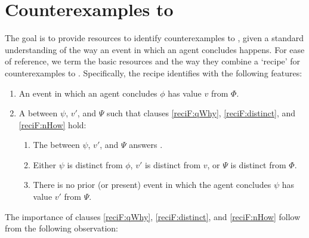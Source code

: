 \section*{Counterexamples to \issueInclusion{}}


\begin{note}
  The goal is to provide resources to identify counterexamples to \issueInclusion{}, given a standard understanding of the way an event in which an agent concludes happens.
  For ease of reference, we term the basic resources and the way they combine a `recipe' for counterexamples to \issueInclusion{}.
  Specifically, the recipe identifies  with the following features:
  \begin{enumerate}
  \item
    An event in which an agent concludes \(\phi\) has value \(v\) from \(\Phi\).
  \item
    A \ros{} between \(\psi\), \(v'\), and \(\Psi\) such that clauses \ref{reciF:qWhy}, \ref{reciF:distinct}, and \ref{reciF:nHow} hold:
    \begin{enumerate}[label=\Alph*., ref=\Alph*]
    \item
      \label{reciF:qWhy}
      The \ros{} between \(\psi\), \(v'\), and \(\Psi\) answers \qWhy{}.
    \item
      \label{reciF:distinct}
      Either \(\psi\) is distinct from \(\phi\), \(v'\) is distinct from \(v\), or \(\Psi\) is distinct from \(\Phi\).
    \item
      \label{reciF:nHow}
      There is no prior (or present) event in which the agent concludes \(\psi\) has value \(v'\) from \(\Psi\).
    \end{enumerate}
  \end{enumerate}

    The importance of clauses \ref{reciF:qWhy}, \ref{reciF:distinct}, and \ref{reciF:nHow} follow from the following observation:


\end{note}
